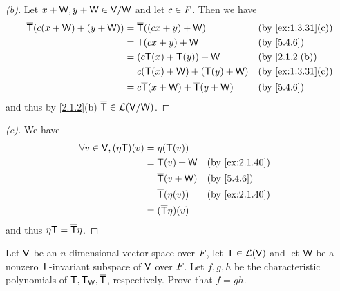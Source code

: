 \begin{proof}[(b)]
	Let \(x + \mathsf{W}, y + \mathsf{W} \in \mathsf{V} / \mathsf{W}\) and let \(c \in \mathit{F}\).
	Then we have
	\begin{align*}
		\overline{\T}(c(x + \W) + (y + \W)) & = \overline{\T}((cx + y) + \W)                    &  & \by{ex:1.3.31}[c] \\
		                                    & = \T(cx + y) + \W                                 &  & \by{5.4.6}        \\
		                                    & = (c \T(x) + \T(y)) + \W                          &  & \by{2.1.2}[b]     \\
		                                    & = c (\T(x) + \W) + (\T(y) + \W)                   &  & \by{ex:1.3.31}[c] \\
		                                    & = c \overline{\T}(x + \W) + \overline{\T}(y + \W) &  & \by{5.4.6}
	\end{align*}
	and thus by \cref{2.1.2}(b) \(\overline{\mathsf{T}} \in \mathcal{L}(\mathsf{V} / \mathsf{W})\).
\end{proof}

\begin{proof}[(c)]
	We have
	\begin{align*}
		\forall v \in \V, (\eta \T)(v) & = \eta(\T(v))                                 \\
		                               & = \T(v) + \W              &  & \by{ex:2.1.40} \\
		                               & = \overline{\T}(v + \W)   &  & \by{5.4.6}     \\
		                               & = \overline{\T}(\eta(v))  &  & \by{ex:2.1.40} \\
		                               & = (\overline{\T} \eta)(v)
	\end{align*}
	and thus \(\eta \mathsf{T} = \overline{\mathsf{T}} \eta\).
\end{proof}

\begin{ex}\label{ex:5.4.28}
	Let \(\mathsf{V}\) be an \(n\)-dimensional vector space over \(\mathit{F}\), let \(\mathsf{T} \in \mathcal{L}(\mathsf{V})\) and let \(\mathsf{W}\) be a nonzero \(\mathsf{T}\)-invariant subspace of \(\mathsf{V}\) over \(\mathit{F}\).
	Let \(f, g, h\) be the characteristic polynomials of \(\mathsf{T}, \mathsf{T}_{\mathsf{W}}, \overline{\mathsf{T}}\), respectively.
	Prove that \(f = gh\).
\end{ex}

